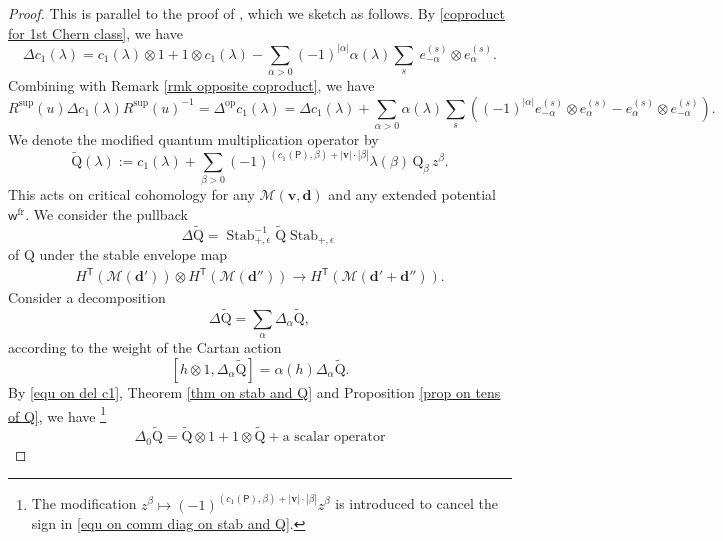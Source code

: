 \documentclass[10pt]{amsart}
\theoremstyle{definition}
\numberwithin{equation}{section}
\newcommand{\sQ}{\mathrm{Q}}
\newcommand{\bv}{\mathbf{v}}
\newcommand{\bd}{\mathbf{d}}
\newcommand{\cM}{\mathcal{M}}
\newcommand{\sT}{\mathsf{T}}
\newcommand{\sw}{\mathsf{w}}
\newcommand{\Stab}{\operatorname{Stab}}
\begin{document}
\begin{proof}
This is parallel to the proof of \cite[Thm.~10.2.1]{MO}, which we sketch as follows.  
By \eqref{coproduct for 1st Chern class}, we have 
\begin{equation}\label{equ on del c1}
\Delta c_1(\lambda)=c_1(\lambda)\otimes 1+1\otimes c_1(\lambda)-\sum_{\alpha>0} (-1)^{|\alpha|}\alpha(\lambda)\sum_s\: e_{-\alpha}^{(s)}\otimes e_{\alpha}^{(s)}.
\end{equation}
Combining with Remark \ref{rmk opposite coproduct}, we have 
\begin{equation}\label{equ on sand del c1}
R^{\mathrm{sup}}(u)\Delta c_1(\lambda) R^{\mathrm{sup}}(u)^{-1}=\Delta^{\mathrm{op}} c_1(\lambda)=\Delta c_1(\lambda)+
\sum_{\alpha>0}\alpha(\lambda)\sum_s \left((-1)^{|\alpha|}e_{-\alpha}^{(s)}\otimes e_{\alpha}^{(s)}-e_{\alpha}^{(s)}\otimes e_{-\alpha}^{(s)} \right).
\end{equation}
We denote the modified quantum multiplication operator by 
$$\widetilde{\sQ}(\lambda):=c_1(\lambda)+\sum_{\beta>0}(-1)^{(c_1(\mathsf P),\beta)+|\bv|\cdot |\beta|}\lambda(\beta)\,\sQ_{\beta}\,z^\beta. $$ 
This acts on critical cohomology for any $\cM(\bv,\bd)$ and any extended potential $\sw^{\mathrm{fr}}$. 
We consider the pullback 
\begin{equation}\label{equ on deltatiltQ}\Delta \widetilde{\sQ}=\Stab_{+,\epsilon}^{-1}\widetilde{\sQ}\Stab_{+,\epsilon} \end{equation} 
of $\sQ$ under the stable envelope map 
\begin{align*}
H^{\sT}(\cM(\bd'))\otimes H^{\sT}(\cM(\bd''))\to H^{\sT}(\cM(\bd'+\bd'')). 
\end{align*}
Consider a decomposition 
$$\Delta \widetilde{\sQ}=\sum_{\alpha} \Delta_\alpha \widetilde{\sQ}, $$
according to the weight of the Cartan action
$$[h\otimes 1,\Delta_\alpha \widetilde{\sQ}]=\alpha(h) \Delta_\alpha \widetilde{\sQ}. $$
By \eqref{equ on del c1}, Theorem \ref{thm on stab and Q} and Proposition \ref{prop on tens of Q}, we have \footnote{The modification $z^\beta\mapsto (-1)^{(c_1(\mathsf P),\beta)+|\bv|\cdot |\beta|} z^\beta$ is introduced to cancel the sign in \eqref{equ on comm diag on stab and Q}.}
\begin{equation}\label{equ on Delta0Q}\Delta_0 \widetilde{\sQ}=\widetilde{\sQ}\otimes 1+1\otimes \widetilde{\sQ}+\text{a scalar operator} \end{equation}

\end{proof}
\end{document}
